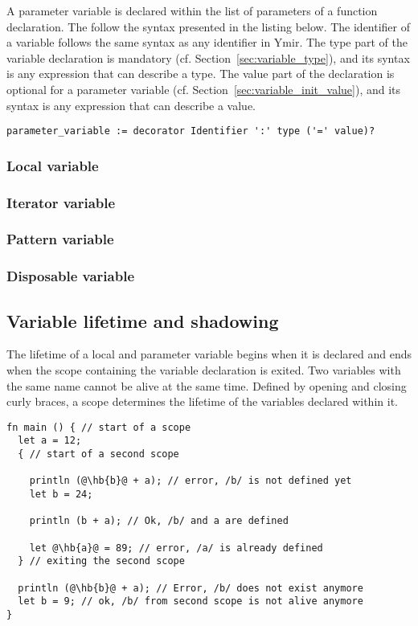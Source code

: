 A parameter variable is declared within the list of parameters of a function
declaration. The follow the syntax presented in the listing below. The
identifier of a variable follows the same syntax as any identifier in Ymir. The
type part of the variable declaration is mandatory (cf.
Section~\ref{sec:variable_type}), and its syntax is any expression that can
describe a type. The value part of the declaration is optional for a parameter
variable (cf. Section~\ref{sec:variable_init_value}), and its syntax is any
expression that can describe a value.

\begin{lstlisting}[style=bashVerb]
parameter_variable := decorator Identifier ':' type ('=' value)?
\end{lstlisting}

\subsubsection*{Local variable}
\subsubsection*{Iterator variable}
\subsubsection*{Pattern variable}
\subsubsection*{Disposable variable}

\subsection{Variable lifetime and shadowing}

The lifetime of a local and parameter variable begins when it is declared and
ends when the scope containing the variable declaration is exited. Two variables
with the same name cannot be alive at the same time. Defined by opening and
closing curly braces, a scope determines the lifetime of the variables declared
within it.

\begin{lstlisting}[style=coloredverbatim, escapechar=@]
fn main () { // start of a scope
  let a = 12;
  { // start of a second scope

    println (@\hb{b}@ + a); // error, /b/ is not defined yet
    let b = 24;

    println (b + a); // Ok, /b/ and a are defined

    let @\hb{a}@ = 89; // error, /a/ is already defined
  } // exiting the second scope

  println (@\hb{b}@ + a); // Error, /b/ does not exist anymore
  let b = 9; // ok, /b/ from second scope is not alive anymore
}
\end{lstlisting}

